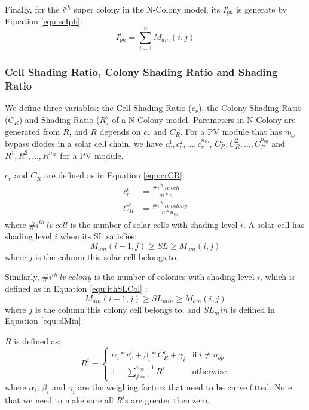 Finally, for the $i^{th}$ super colony in the N-Colony model, its $I_{ph}^i$ is generate by Equation \ref{equ:scIph}:
\begin{equation}\label{equ:scIph}
  I_{ph}^i = \sum_{j=1}^n{M_{am}(i,j)}
\end{equation}

\subsubsection{Cell Shading Ratio, Colony Shading Ratio and Shading Ratio}
We define three variables: the Cell Shading Ratio ($c_r$), the Colony Shading Ratio ($C_R$) and Shading Ratio ($R$) of a N-Colony model. Parameters in N-Colony are generated from $R$, and $R$ depends on $c_r$ and $C_R$. For a PV module that has $n_{bp}$ bypass diodes in a solar cell chain, we have $c_r^1, c_r^2, \dots, c_r^{n_{bp}}$, $C_R^1,C_R^2,\dots,C_R^{n_{bp}}$ and $R^1,R^2,\dots,R^{n_{bp}}$ for a PV module.

$c_r$ and $C_R$ are defined as in Equation \ref{equ:crCR}:
\begin{equation}\label{equ:crCR}
\begin{aligned}
  c_r^i & = \frac{\#i^{th}\ lv\ cell}{m*n} \\
  C_R^i & = \frac{\#i^{th}\ lv\ colony}{n*n_{bp}}
\end{aligned}
\end{equation}
where $\#i^{th}\ lv\ cell$ is the number of solar cells with shading level $i$. A solar cell has shading level $i$ when its SL satisfies:
\begin{equation}\label{equ:ithSLCell}
M_{am} (i-1, j) \ge SL \ge M_{am} (i, j)
\end{equation}
where $j$ is the column this solar cell belongs to.

Similarly, $\#i^{th}\ lv\ colony$ is the number of colonies with shading level $i$, which is defined as in Equation \ref{equ:ithSLCol} :
\begin{equation}\label{equ:ithSLCol}
M_{am} (i-1, j) \ge SL_{min} \ge M_{am} (i, j)
\end{equation}
where $j$ is the column this colony cell belongs to, and $SL_min$ is defined in Equation \ref{equ:slMin}.

$R$ is defined as:
\begin{equation}\label{equ:rDef}
R^i =
    \begin{cases}
      \alpha_i*c_r^i+ \beta_i*C_R^i+ \gamma_i  & \text{if}\  i \neq n_{bp}\\
      1 - \sum_{j = 1}^{n_{bp}-1}{R^i} & \text{otherwise}
     \end{cases}
\end{equation}
where $\alpha_i$, $\beta_i$ and $\gamma_i$ are the weighing factors that need to be curve fitted. Note that we need to make sure all $R^i$s are greater then zero.

